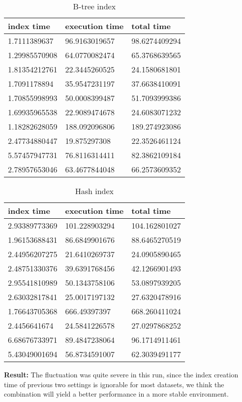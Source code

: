 \begin{itemize*}
\begin{table}[H]
\begin{center}
\begin{tabular}{|l|l|l|}
\hline
index time & execution time & total time                \\ \hline
1.7111389637 & 96.9163019657 & 98.6274409294 \\ \hline
1.29985570908 & 64.0770082474 & 65.3768639565 \\ \hline
1.81354212761 & 22.3445260525 & 24.1580681801 \\ \hline
1.7091178894 & 35.9547231197 & 37.6638410091 \\ \hline
1.70855998993 & 50.0008399487 & 51.7093999386 \\ \hline
1.69935965538 & 22.9089474678 & 24.6083071232 \\ \hline
1.18282628059 & 188.092096806 & 189.274923086 \\ \hline
2.47734880447 & 19.875297308 & 22.3526461124 \\ \hline
5.57457947731 & 76.8116314411 & 82.3862109184 \\ \hline
2.78957653046 & 63.4677844048 & 66.2573609352 \\ \hline
\end{tabular}
\end{center}
\caption{B-tree index}
\end{table}

\begin{table}[H]
\begin{center}
\begin{tabular}{|l|l|l|}
\hline
index time & execution time & total time     \\ \hline
2.93389773369 & 101.228903294 & 104.162801027 \\ \hline
1.96153688431 & 86.6849901676 & 88.6465270519 \\ \hline
2.44956207275 & 21.6410269737 & 24.0905890465 \\ \hline
2.48751330376 & 39.6391768456 & 42.1266901493 \\ \hline
2.95541810989 & 50.1343758106 & 53.0897939205 \\ \hline
2.63032817841 & 25.0017197132 & 27.6320478916 \\ \hline
1.76643705368 & 666.49397397 & 668.260411024 \\ \hline
2.4456641674 & 24.5841226578 & 27.0297868252 \\ \hline
6.68676733971 & 89.4847238064 & 96.1714911461 \\ \hline
5.43049001694 & 56.8734591007 & 62.3039491177 \\ \hline
\end{tabular}
\end{center}
\caption{Hash index}
\end{table}

\par \textbf{Result:} The fluctuation was quite severe in this run, since the index creation time of previous two settings is ignorable for most datasets, we think the combination will yield a better performance in a more stable environment.
\end{itemize*}
